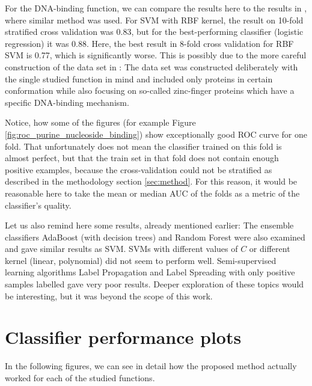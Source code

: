 \documentclass[11pt,twoside,a4paper]{book}
\begin{document}
For the DNA-binding function, we can compare the results here to the results in \cite{szabova},
where similar method was used.
For SVM with RBF kernel, the result on 10-fold stratified cross validation was 0.83,
but for the best-performing classifier (logistic regression) it was 0.88.
Here, the best result in 8-fold cross validation for RBF SVM is 0.77,
which is significantly worse. 
This is possibly due to the more careful construction
of the data set in \cite{szabova}: 
The data set was constructed deliberately with the single studied function in mind 
and included only proteins in certain conformation while also
focusing on so-called zinc-finger proteins which have a specific DNA-binding mechanism.

Notice, how some of the figures (for example Figure \ref{fig:roc_purine_nucleoside_binding})
show exceptionally good ROC curve for one fold.
That unfortunately does not mean the classifier trained on this fold
is almost perfect, but that the train set in that fold does not contain 
enough positive examples,
because the cross-validation could not be stratified as described in the methodology section \ref{sec:method}.
For this reason, it would be reasonable here to take the mean or median AUC of 
the folds as a metric of the classifier's quality.

Let us also remind here some results, already mentioned earlier:
The ensemble classifiers AdaBoost (with decision trees) and Random Forest
were also examined and gave similar results as SVM.
SVMs with different values of $C$ or different kernel (linear, polynomial) did not seem to perform well.
Semi-supervised learning algorithms Label Propagation and Label Spreading \cite{semi}
with only positive samples labelled gave very poor results.
Deeper exploration of these topics would be interesting,
but it was beyond the scope of this work.

\section{Classifier performance plots}
In the following figures,
we can see in detail how the proposed method actually worked for each of the studied functions.
\end{document}
